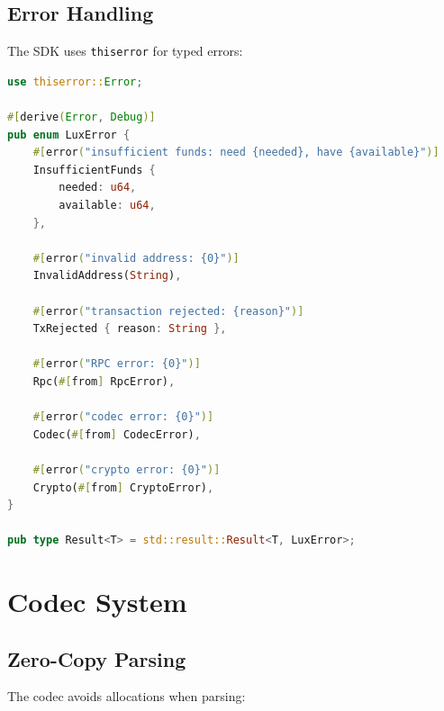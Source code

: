 \documentclass[11pt,twocolumn]{article}
\begin{document}
\subsection{Error Handling}

The SDK uses \texttt{thiserror} for typed errors:

\begin{lstlisting}[language=Rust,caption=Error Types]
use thiserror::Error;

#[derive(Error, Debug)]
pub enum LuxError {
    #[error("insufficient funds: need {needed}, have {available}")]
    InsufficientFunds {
        needed: u64,
        available: u64,
    },

    #[error("invalid address: {0}")]
    InvalidAddress(String),

    #[error("transaction rejected: {reason}")]
    TxRejected { reason: String },

    #[error("RPC error: {0}")]
    Rpc(#[from] RpcError),

    #[error("codec error: {0}")]
    Codec(#[from] CodecError),

    #[error("crypto error: {0}")]
    Crypto(#[from] CryptoError),
}

pub type Result<T> = std::result::Result<T, LuxError>;
\end{lstlisting}

\section{Codec System}

\subsection{Zero-Copy Parsing}

The codec avoids allocations when parsing:
\end{document}
